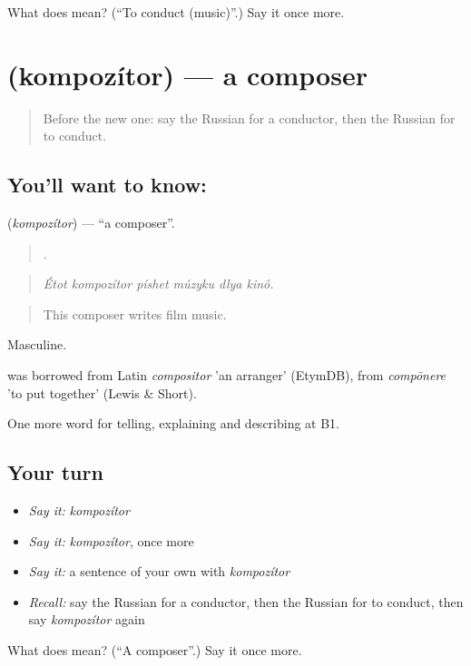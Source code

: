 \begin{tcolorbox}[breakable,colback=teal!4,colframe=teal!35!black,title={Before you move on}]
What does  mean? (\textquotedblleft{}To conduct (music)\textquotedblright{}.) Say it once more.
\end{tcolorbox}
\section[\texorpdfstring{\ru{композитор} (kompozítor)}{композитор (kompozítor)}]{ (kompozítor) — a composer}

\label{lesson:RU-C517-kompozitor}



\begin{quote}
Before the new one: say the Russian for a conductor, then the Russian for to conduct.
\end{quote}

\subsection*{You'll want to know: }
\textbf{} (\emph{kompozítor}) — \textquotedblleft{}a composer\textquotedblright{}.

\begin{quote}
     .
\end{quote}

\begin{quote}
\emph{Étot kompozítor píshet múzyku dlya kinó.}
\end{quote}

\begin{quote}
This composer writes film music.
\end{quote}

Masculine.

\begin{cousinweb}
\emph{} was borrowed from Latin \emph{compositor} 'an arranger' (EtymDB), from \emph{compōnere} 'to put together' (Lewis \& Short).
\end{cousinweb}

\begin{grammarlens}[title={What you've built}]
One more word for telling, explaining and describing at B1.
\end{grammarlens}

\subsection*{Your turn}
\begin{itemize}
\raggedright
  \item \emph{Say it:} \emph{kompozítor}
  \item \emph{Say it:} \emph{kompozítor}, once more
  \item \emph{Say it:} a sentence of your own with \emph{kompozítor}
  \item \emph{Recall:} say the Russian for a conductor, then the Russian for to conduct, then say \emph{kompozítor} again
\end{itemize}

\begin{tcolorbox}[breakable,colback=teal!4,colframe=teal!35!black,title={Before you move on}]
What does  mean? (\textquotedblleft{}A composer\textquotedblright{}.) Say it once more.
\end{tcolorbox}
